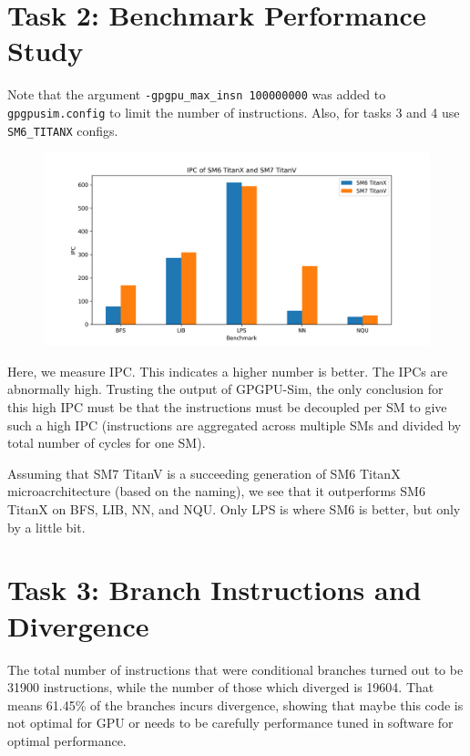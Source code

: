 \documentclass{article}
\begin{document}
\section{Task 2: Benchmark Performance Study}
Note that the argument \verb|-gpgpu_max_insn 100000000| was added to \verb|gpgpusim.config| to limit the number of instructions. Also, for tasks 3 and 4 use \verb|SM6_TITANX| configs.
\begin{figure}[H]
	\centerline{\includegraphics[width=6in]{figures/ipc.png}}
\end{figure}

Here, we measure IPC. This indicates a higher number is better. The IPCs are abnormally high. Trusting the output of GPGPU-Sim, the only conclusion for this high IPC must be that the instructions must be decoupled per SM to give such a high IPC (instructions are aggregated across multiple SMs and divided by total number of cycles for one SM).

Assuming that SM7 TitanV is a succeeding generation of SM6 TitanX microacrchitecture (based on the naming), we see that it outperforms SM6 TitanX on BFS, LIB, NN, and NQU. Only LPS is where SM6 is better, but only by a little bit.

\section{Task 3: Branch Instructions and Divergence}
The total number of instructions that were conditional branches turned out to be 31900 instructions, while the number of those which diverged is 19604. That means 61.45\% of the branches incurs divergence, showing that maybe this code is not optimal for GPU or needs to be carefully performance tuned in software for optimal performance.
\end{document}
